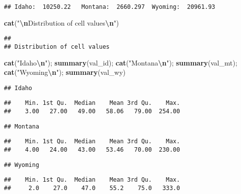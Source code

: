 \documentclass[
]{article}
\newenvironment{Shaded}{\begin{snugshade}}{\end{snugshade}}
\newcommand{\FunctionTok}[1]{\textcolor[rgb]{0.13,0.29,0.53}{\textbf{#1}}}
\newcommand{\NormalTok}[1]{#1}
\newcommand{\SpecialCharTok}[1]{\textcolor[rgb]{0.81,0.36,0.00}{\textbf{#1}}}
\newcommand{\StringTok}[1]{\textcolor[rgb]{0.31,0.60,0.02}{#1}}
\begin{document}
\begin{verbatim}
## Idaho:  10250.22   Montana:  2660.297  Wyoming:  20961.93
\end{verbatim}

\begin{Shaded}
\begin{Highlighting}[]
\FunctionTok{cat}\NormalTok{(}\StringTok{"}\SpecialCharTok{\textbackslash{}n}\StringTok{Distribution of cell values}\SpecialCharTok{\textbackslash{}n}\StringTok{"}\NormalTok{)}
\end{Highlighting}
\end{Shaded}

\begin{verbatim}
## 
## Distribution of cell values
\end{verbatim}

\begin{Shaded}
\begin{Highlighting}[]
\FunctionTok{cat}\NormalTok{(}\StringTok{"Idaho}\SpecialCharTok{\textbackslash{}n}\StringTok{"}\NormalTok{); }\FunctionTok{summary}\NormalTok{(val\_id); }\FunctionTok{cat}\NormalTok{(}\StringTok{"Montana}\SpecialCharTok{\textbackslash{}n}\StringTok{"}\NormalTok{); }\FunctionTok{summary}\NormalTok{(val\_mt); }\FunctionTok{cat}\NormalTok{(}\StringTok{"Wyoming}\SpecialCharTok{\textbackslash{}n}\StringTok{"}\NormalTok{); }\FunctionTok{summary}\NormalTok{(val\_wy) }
\end{Highlighting}
\end{Shaded}

\begin{verbatim}
## Idaho
\end{verbatim}

\begin{verbatim}
##    Min. 1st Qu.  Median    Mean 3rd Qu.    Max. 
##    3.00   27.00   49.00   58.06   79.00  254.00
\end{verbatim}

\begin{verbatim}
## Montana
\end{verbatim}

\begin{verbatim}
##    Min. 1st Qu.  Median    Mean 3rd Qu.    Max. 
##    4.00   24.00   43.00   53.46   70.00  230.00
\end{verbatim}

\begin{verbatim}
## Wyoming
\end{verbatim}

\begin{verbatim}
##    Min. 1st Qu.  Median    Mean 3rd Qu.    Max. 
##     2.0    27.0    47.0    55.2    75.0   333.0
\end{verbatim}
\end{document}
